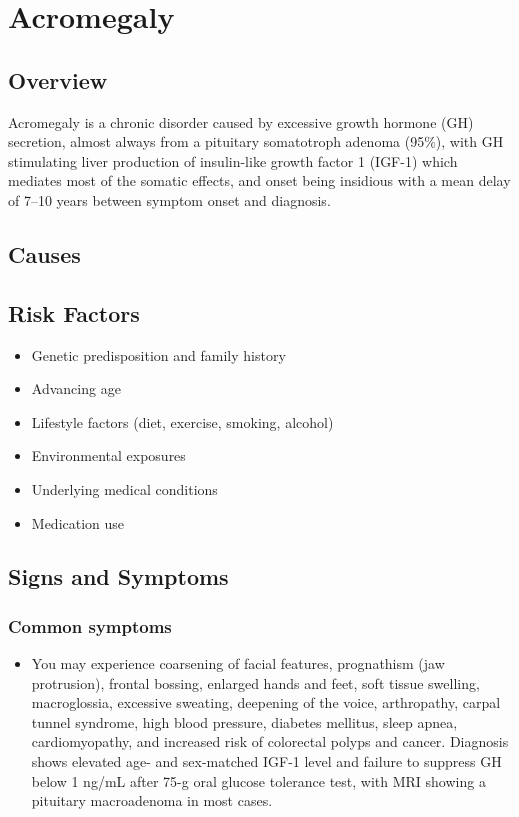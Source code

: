 \chapter{Acromegaly}
\label{sec:Acromegaly}

\section{Overview}
Acromegaly is a chronic disorder caused by excessive growth hormone (GH) secretion, almost always from a pituitary somatotroph adenoma (95\%), with GH stimulating liver production of insulin-like growth factor 1 (IGF-1) which mediates most of the somatic effects, and onset being insidious with a mean delay of 7--10 years between symptom onset and diagnosis.
\section{Causes}
\section{Risk Factors}

\begin{itemize}[noitemsep]
  \item Genetic predisposition and family history
  \item Advancing age
  \item Lifestyle factors (diet, exercise, smoking, alcohol)
  \item Environmental exposures
  \item Underlying medical conditions
  \item Medication use
\end{itemize}
\section{Signs and Symptoms}

\subsection{Common symptoms}
\begin{itemize}[noitemsep]
  \item You may experience coarsening of facial features, prognathism (jaw protrusion), frontal bossing, enlarged hands and feet, soft tissue swelling, macroglossia, excessive sweating, deepening of the voice, arthropathy, carpal tunnel syndrome, high blood pressure, diabetes mellitus, sleep apnea, cardiomyopathy, and increased risk of colorectal polyps and cancer. Diagnosis shows elevated age- and sex-matched IGF-1 level and failure to suppress GH below 1 ng/mL after 75-g oral glucose tolerance test, with MRI showing a pituitary macroadenoma in most cases. 
  \end{itemize}

